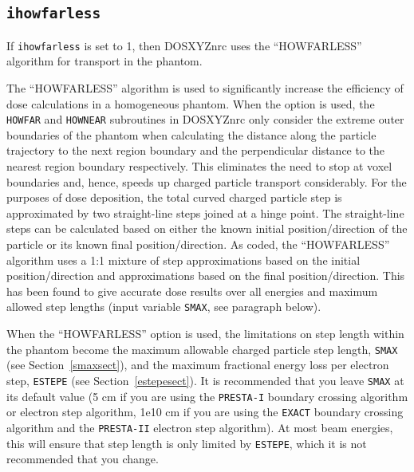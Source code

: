 \documentclass[12pt,twoside]{article}      %
\newcommand{\indexm}[1]{\index{#1}}
\begin{document}
\subsection{{\tt ihowfarless}}
\label{howfarlesssect}
\indexm{ihowfarless}
\indexm{``HOWFARLESS'' option}

If {\tt ihowfarless} is set to 1, then DOSXYZnrc uses the ``HOWFARLESS''
algorithm for transport in the phantom.

The ``HOWFARLESS'' algorithm is used to significantly increase the
efficiency of dose calculations in a homogeneous phantom.  When the option
is used, the {\tt HOWFAR} and {\tt HOWNEAR} subroutines in DOSXYZnrc only
consider the extreme outer boundaries of the phantom when calculating
the distance along the particle trajectory to the next region boundary
and the perpendicular distance
to the nearest region boundary respectively.  This eliminates the need
to stop at voxel boundaries and, hence, speeds up charged particle
transport considerably.  For the purposes of dose deposition, the
total curved charged particle step is approximated by two straight-line
steps joined at a hinge point.  The straight-line steps can be calculated
based on either the known initial position/direction of the particle
or its known final position/direction.  As coded, the ``HOWFARLESS''
algorithm uses a 1:1 mixture of step approximations based
on the initial position/direction and approximations based on the
final position/direction.  This has been found to give accurate dose
results over all energies and maximum allowed step lengths
(input variable {\tt SMAX}, see paragraph below).

When the ``HOWFARLESS'' option is used, the limitations on step
length within the phantom become the maximum allowable charged particle step length,
{\tt SMAX} (see Section~\ref{smaxsect}), and the maximum fractional
energy loss per electron step, {\tt ESTEPE} (see Section~\ref{estepesect}).
It is recommended that you leave {\tt SMAX} at its default
value (5 cm if you are using the {\tt PRESTA-I} boundary crossing
algorithm or electron step algorithm, 1e10 cm if you are using
the {\tt EXACT} boundary crossing algorithm and the {\tt PRESTA-II}
electron step algorithm).  At most beam energies, this will ensure
that step length is only limited by {\tt ESTEPE}, which it is not
recommended that you change.
\end{document}
